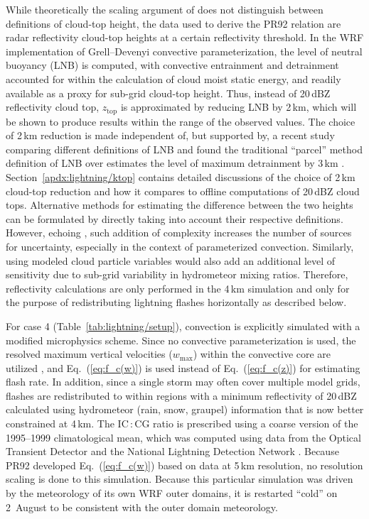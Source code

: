 While theoretically the scaling argument of \citet{Vonnegut:1963aa} does not
distinguish between definitions of cloud-top height, the data used to derive
the PR92 relation are radar reflectivity cloud-top heights at a certain
reflectivity threshold. In the WRF implementation of Grell--Devenyi convective
parameterization, the level of neutral buoyancy (LNB) is computed, with
convective entrainment and detrainment accounted for within the calculation
of cloud moist static energy, and readily available as a proxy for sub-grid
cloud-top height. Thus, instead of 20\,\unit{dBZ} reflectivity cloud top,
$z_{\mathrm{top}}$ is approximated by reducing LNB by 2\,\unit{km}, which
will be shown to produce results within the range of the observed values. The
choice of 2\,\unit{km} reduction is made independent of, but supported by, a
recent study comparing different definitions of LNB and found the traditional
``parcel'' method definition of LNB over estimates the level of maximum
detrainment by 3\,\unit{km} \citep{Takahashi:2012uq}. Section~\ref{apdx:lightning/ktop}
contains detailed discussions of the choice of 2\,\unit{km}
cloud-top reduction and how it compares to offline computations of
20\,\unit{dBZ} cloud tops. Alternative methods for estimating the difference
between the two heights can be formulated by directly taking into account
their respective definitions. However, echoing \cite{Barthe:2010uq}, such
addition of complexity increases the number of sources for uncertainty,
especially in the context of parameterized convection. Similarly, using
modeled cloud particle variables would also add an additional level of
sensitivity due to sub-grid variability in hydrometeor mixing ratios.
Therefore, reflectivity calculations are only performed in the 4\,\unit{km}
simulation and only for the purpose of redistributing lightning flashes
horizontally as described below.

For case 4 (Table~\ref{tab:lightning/setup}), convection is explicitly simulated with a
modified \citet{Lin:1983zr} microphysics scheme. Since no convective
parameterization is used, the resolved maximum vertical velocities
($w_{\max}$) within the convective core are utilized \citep{Barth:2012qf},
and Eq.~(\ref{eq:f_c(w)}) is used instead of Eq.~(\ref{eq:f_c(z)}) for
estimating flash rate. In addition, since a single storm may often cover
multiple model grids, flashes are redistributed to within regions with a
minimum reflectivity of 20\,\unit{dBZ} calculated using hydrometeor (rain,
snow, graupel) information that is now better constrained at 4\,\unit{km}.
The IC\,:\,CG ratio is prescribed using a coarse version of the
\cite{Boccippio:2001ys} 1995--1999 climatological mean, which was computed
using data from the Optical Transient Detector
\citep[OTD;][]{Christian:1996aa} and the National Lightning Detection Network
\citep[NLDN;][]{5173582}. Because PR92 developed Eq.~(\ref{eq:f_c(w)}) based
on data at 5\,\unit{km} resolution, no resolution scaling is done to this
simulation. Because this particular simulation was driven by the meteorology
of its own WRF outer domains, it is restarted ``cold'' on 2~August to be
consistent with the outer domain meteorology.

